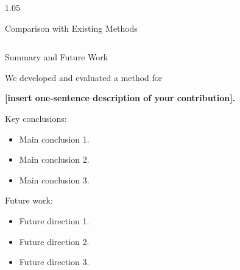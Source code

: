 \documentclass[final]{beamer}
\newlength{\colwidth}
\begin{document}
\begin{frame}[t]
\begin{columns}[t]
\begin{column}{1.05\colwidth}
\begin{block}{Comparison with Existing Methods}
\begin{table}
\begin{tabular}{lccc}
\end{tabular}

\end{table}

\end{block}



\begin{block}{Summary and Future Work}

We developed and evaluated a method for

\textbf{
    [insert one-sentence description of your contribution].
}

\vspace{0.5cm}

Key conclusions:

\begin{itemize}

    \item Main conclusion 1.

    \item Main conclusion 2.

    \item Main conclusion 3.

\end{itemize}

\vspace{0.5cm}

Future work:

\begin{itemize}

    \item Future direction 1.

    \item Future direction 2.

    \item Future direction 3.

\end{itemize}

\end{block}







\end{column}
\end{columns}
\end{frame}
\end{document}
